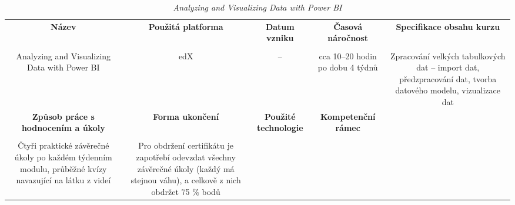 \begin{landscape}

\begin{table}[htbp]

\renewcommand\thetable{5}

\caption{\textit{Analyzing and Visualizing Data with Power BI}}\label{tab5}

\footnotesize

{

\justifying

\begin{tabularx}{\linewidth}{CCCCC}

\toprule

\textbf{Název} &

\textbf{Použitá platforma} &

\textbf{Datum vzniku} &

\textbf{Časová náročnost} &
 
\textbf{Specifikace obsahu kurzu}

\\

\tabularnewline
\midrule

Analyzing and Visualizing Data with Power BI

&

edX

&

–

&

cca 10–20 hodin po dobu 4 týdnů

&

Zpracování velkých tabulkových dat – import dat, předzpracování dat, tvorba datového modelu, vizualizace dat

\\
\toprule

\textbf{Způsob práce s hodnocením a úkoly} &

\textbf{Forma ukončení} &

\textbf{Použité technologie} &

\textbf{Kompetenční rámec} 

\\

\tabularnewline
\midrule

Čtyři praktické závěrečné úkoly po každém týdenním modulu, průběžné kvízy navazující na látku z videí 

&

Pro obdržení certifikátu je zapotřebí odevzdat všechny závěrečné úkoly (každý má stejnou váhu), a celkově z nich obdržet 75 \% bodů


\end{tabularx}}
\end{table}
\end{landscape}
